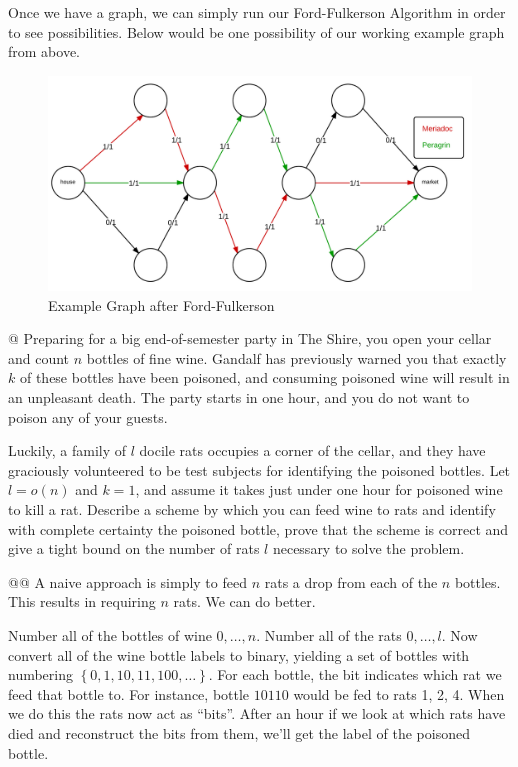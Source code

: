 \documentclass[10pt]{article}\usepackage[]{graphicx}\usepackage[]{xcolor}
\begin{document}
\begin{easylist}[enumerate]
    Once we have a graph, we can simply run our Ford-Fulkerson Algorithm in order to see possibilities. Below would be
    one possibility of our working example graph from above.

    \begin{figure}[H]
        \centering
        \includegraphics[scale=0.5]{./img/ps9-4-a.png}
        \caption{Example Graph after Ford-Fulkerson}
    \end{figure}

    @ Preparing for a big end-of-semester party in The Shire, you open your cellar and count $n$ bottles of fine wine.
    Gandalf has previously warned you that exactly $k$ of these bottles have been poisoned, and consuming poisoned wine
    will result in an unpleasant death. The party starts in one hour, and you do not want to poison any of your
    guests.\newline

    Luckily, a family of $l$ docile rats occupies a corner of the cellar, and they have graciously volunteered to be
    test subjects for identifying the poisoned bottles. Let $l = o(n)$ and $k = 1$, and assume it takes just under one
    hour for poisoned wine to kill a rat.  Describe a scheme by which you can feed wine to rats and identify with
    complete certainty the poisoned bottle, prove that the scheme is correct and give a tight bound on the number of
    rats $l$ necessary to solve the problem.

    @@ A naive approach is simply to feed $n$ rats a drop from each of the $n$ bottles. This results in requiring $n$
    rats. We can do better.\newline

    Number all of the bottles of wine $0, \ldots, n$. Number all of the rats $0, \ldots, l$. Now convert all of the wine
    bottle labels to binary, yielding a set of bottles with numbering $\left\{ 0, 1, 10, 11, 100, \ldots \right\}$. For
    each bottle, the bit indicates which rat we feed that bottle to. For instance, bottle $10110$ would be fed to rats
    1, 2, 4. When we do this the rats now act as ``bits''. After an hour if we look at which rats have died and
    reconstruct the bits from them, we'll get the label of the poisoned bottle.\newline


\end{easylist}
\end{document}
